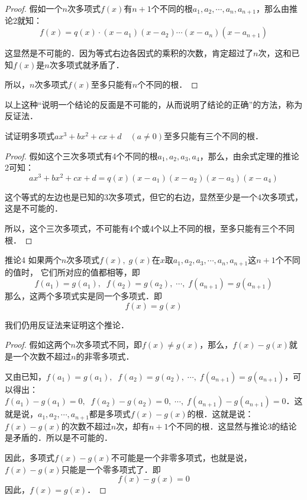 \begin{proof}
假如一个$n$次多项式$f(x)$有$n+1$个不同的根$a_1,a_2,\cdots,a_n,a_{n+1}$，那么由推论2就知：
\[f (x) =q (x) \cdot  (x-a_1) (x-a_2)\cdots (x-a_n)(x-a_{n+1})\] 

这显然是不可能的．因为等式右边各因式的乘积的次数，肯定超过了$n$次，这和已知$f(x)$是$n$次多项式就矛盾了．

所以，$n$次多项式$f(x)$至多只能有$n$个不同的根．
\end{proof}

以上这种“说明一个结论的反面是不可能的，从而说明了结论的正确”的方法，称为反证法．

\begin{example}
    试证明多项式$ax^3+bx^2+cx+d\quad (a\ne 0)$至多只能有三个不同的根．
\end{example}


\begin{proof}
    假如这个三次多项式有4个不同的根$a_1,a_2,a_3,a_4$，那么，由余式定理的推论2可知：
\[ax^3+bx^2+cx+d=q (x) (x-a_1) (x-a_2) (x-a_3) (x-a_4)\]

这个等式的左边也是已知的3次多项式，但它的右边，显然至少是一个4次多项式，这是不可能的．

所以，这个三次多项式，不可能有4个或4个以上不同的根，至多只能有三个不同根．
\end{proof}


\begin{blk}{推论4}
    如果两个$n$次多项式$f(x),\; g(x)$在$x$取$a_1,a_2,a_3,\cdots,a_n,a_{n+1}$这$n+1$个不同的值时，
    它们所对应的值都相等，即
\[f (a_1) =g (a_1) ,\; \; f (a_2) =g (a_2) ,\;  \cdots,\;  f (a_{n+1}) =g (a_{n+1}) \]
那么，这两个多项式实是同一个多项式．即
\[f (x) =g (x) \]
\end{blk}

我们仍用反证法来证明这个推论．

\begin{proof}
假如这两个$n$次多项式不同，即$f(x)\ne g(x)$，那么，$f(x)-g(x)$就是一个次数不超过$n$的非零多项式．

又由已知，$f (a_1) =g (a_1) ,\; \; f (a_2) =g (a_2) ,\;  \cdots,\;  f (a_{n+1}) =g (a_{n+1})$，可以得出：$f (a_1) -g (a_1)=0 ,\; \; f (a_2) -g (a_2)=0 ,\;  \cdots,\;  f (a_{n+1}) -g (a_{n+1})=0$．这就是说，$a_1,a_2,\cdots,a_{n+1}$都是多项式$f(x)-g(x)$的根．这就是说：$f(x)-g(x)$的次数不超过$n$次，却有$n+1$个不同的根．这显然与推论3的结论是矛盾的．所以是不可能的．

因此，多项式$f(x)-g(x)$不可能是一个非零多项式，也就是说，$f(x)-g(x)$只能是一个零多项式了．即
\[f (x) -g (x) =0\]
因此，$f(x)=g(x)$．

\end{proof}

